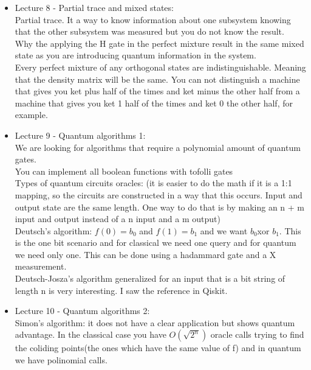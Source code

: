 \documentclass{article}
\begin{document}
\begin{itemize}
    \item {Lecture 8 - Partial trace and mixed states:}\\
    Partial trace. It a way to know information about one subsystem knowing that the other subsystem was measured but you do not know the result.\\
    Why the applying the H gate in the perfect mixture result in the same mixed state as you are introducing quantum information in the system.\\
    Every perfect mixture of any orthogonal states are indistinguishable. Meaning that the density matrix will be the same. You can not distinguish a machine that gives you ket plus half of the times and ket minus the other half from a machine that gives you ket 1 half of the times and ket 0 the other half, for example.\\

    \item {Lecture 9 - Quantum algorithms 1:}\\
    We are looking for algorithms that require a polynomial amount of quantum gates.\\
    You can implement all boolean functions with tofolli gates\\
    Types of quantum circuits oracles: (it is easier to do the math if it is a 1:1 mapping, so the circuits are constructed in a way that this occurs. Input and output state are the same length. One way to do that is by making an n + m input and output instead of a n input and a m output) \\
    Deutsch's algorithm: $f(0) = b_0$ and $f(1) = b_1$ and we want $b_0 $xor $b_1$. This is the one bit scenario and for classical we need one query and for quantum we need only one. This can be done using a hadammard gate and a X measurement.\\ 
    Deutsch-Josza's algorithm generalized for an input that is a bit string of length n is very interesting. I saw the reference in Qiskit. \\

    \item {Lecture 10 - Quantum algorithms 2:}\\
    Simon's algorithm: it does not have a clear application but shows quantum advantage. In the classical case you have $O(\sqrt{2^{n}})$ oracle calls trying to find the coliding points(the ones which have the same value of f) and in quantum we have polinomial calls.\\


\end{itemize}
\end{document}
